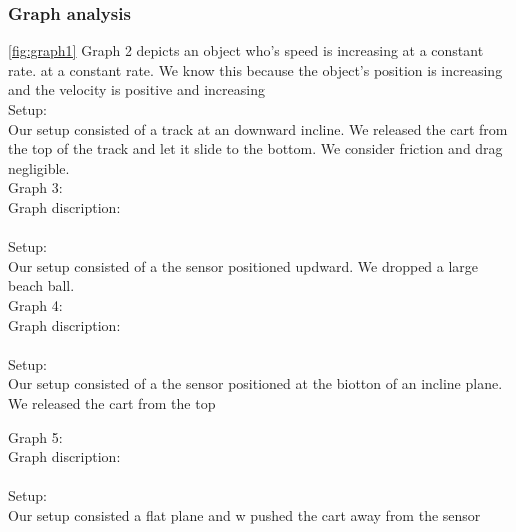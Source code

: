 \documentclass[11pt, letterpaper, includehead]{article}
\begin{document}
  \subsubsection{Graph analysis}
  \ref{fig:graph1}
  Graph 2 depicts an object who's speed is increasing at a constant rate. at a constant rate. We know this because the
  object's position is increasing and the velocity is positive and increasing\\
  \large{Setup:}\\
  Our setup consisted of a track at an downward incline. We released the cart from the 
  top of the track and let it slide to the bottom. We consider friction and drag negligible.\\

  \large{Graph 3:}\\
  \large{Graph discription:}\\
  \\
  \large{Setup:}\\
  Our setup consisted of a the sensor positioned updward. We dropped a large beach ball.\\

  \large{Graph 4:}\\
  \large{Graph discription:}\\
  \\
  \large{Setup:}\\
  Our setup consisted of a the sensor positioned at the biotton of an incline plane. We released the cart from the top 


  \large{Graph 5:}\\
  \large{Graph discription:}\\
  \\
  \large{Setup:}\\
  Our setup consisted a flat plane and w pushed the cart away from the sensor
\end{document}
